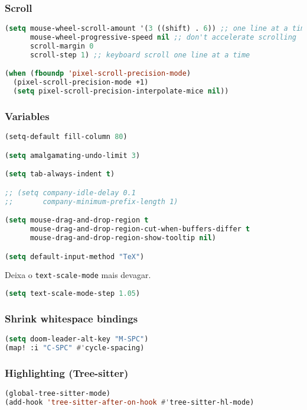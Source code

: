 \documentclass[11pt]{article}
\begin{document}
\subsubsection{Scroll}
\label{sec:scroll}
\begin{lstlisting}[language=Lisp]
(setq mouse-wheel-scroll-amount '(3 ((shift) . 6)) ;; one line at a time
      mouse-wheel-progressive-speed nil ;; don't accelerate scrolling
      scroll-margin 0
      scroll-step 1) ;; keyboard scroll one line at a time

(when (fboundp 'pixel-scroll-precision-mode)
  (pixel-scroll-precision-mode +1)
  (setq pixel-scroll-precision-interpolate-mice nil))
\end{lstlisting}

\subsubsection{Variables}
\label{sec:variables-1}
\begin{lstlisting}[language=Lisp]
(setq-default fill-column 80)

(setq amalgamating-undo-limit 3)

(setq tab-always-indent t)

;; (setq company-idle-delay 0.1
;;       company-minimum-prefix-length 1)

(setq mouse-drag-and-drop-region t
      mouse-drag-and-drop-region-cut-when-buffers-differ t
      mouse-drag-and-drop-region-show-tooltip nil)

(setq default-input-method "TeX")
\end{lstlisting}

Deixa o \texttt{text-scale-mode} mais devagar.

\begin{lstlisting}[language=Lisp]
(setq text-scale-mode-step 1.05)
\end{lstlisting}

\subsubsection{Shrink whitespace\hfill{} bindings}
\label{sec:shrink-whitespace}
\begin{lstlisting}[language=Lisp]
(setq doom-leader-alt-key "M-SPC")
(map! :i "C-SPC" #'cycle-spacing)
\end{lstlisting}

\subsubsection{Highlighting (Tree-sitter)}
\label{sec:highlighting-tree-sitter}
\begin{lstlisting}[language=Lisp]
(global-tree-sitter-mode)
(add-hook 'tree-sitter-after-on-hook #'tree-sitter-hl-mode)
\end{lstlisting}
\end{document}
